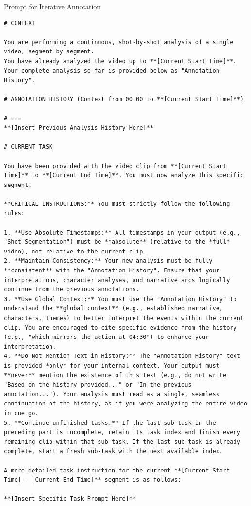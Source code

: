 \documentclass{article}
\theoremstyle{plain}
\theoremstyle{definition}
\theoremstyle{remark}
\begin{document}
\begin{promptbox}{Prompt for Iterative Annotation}
\begin{lstlisting}
# CONTEXT

You are performing a continuous, shot-by-shot analysis of a single video, segment by segment.
You have already analyzed the video up to **[Current Start Time]**. Your complete analysis so far is provided below as "Annotation History".

# ANNOTATION HISTORY (Context from 00:00 to **[Current Start Time]**)

# ===
**[Insert Previous Analysis History Here]**

# CURRENT TASK

You have been provided with the video clip from **[Current Start Time]** to **[Current End Time]**. You must now analyze this specific segment.

**CRITICAL INSTRUCTIONS:** You must strictly follow the following rules:

1. **Use Absolute Timestamps:** All timestamps in your output (e.g., "Shot Segmentation") must be **absolute** (relative to the *full* video), not relative to the current clip.
2. **Maintain Consistency:** Your new analysis must be fully **consistent** with the "Annotation History". Ensure that your interpretations, character analyses, and narrative arcs logically continue from the previous annotations.
3. **Use Global Context:** You must use the "Annotation History" to understand the **global context** (e.g., established narrative, characters, themes) to better interpret the events within the current clip. You are encouraged to cite specific evidence from the history (e.g., "which mirrors the action at 04:30") to enhance your interpretation.
4. **Do Not Mention Text in History:** The "Annotation History" text is provided *only* for your internal context. Your output must **never** mention the existence of this text (e.g., do not write "Based on the history provided..." or "In the previous annotation..."). Your analysis must read as a single, seamless continuation of the history, as if you were analyzing the entire video in one go.
5. **Continue unfinished tasks:** If the last sub-task in the preceding part is incomplete, retain its task index and finish every remaining clip within that sub-task. If the last sub-task is already complete, start a fresh sub-task with the next available index.

A more detailed task instruction for the current **[Current Start Time] - [Current End Time]** segment is as follows:

**[Insert Specific Task Prompt Here]**
\end{lstlisting}
\end{promptbox}
\end{document}
